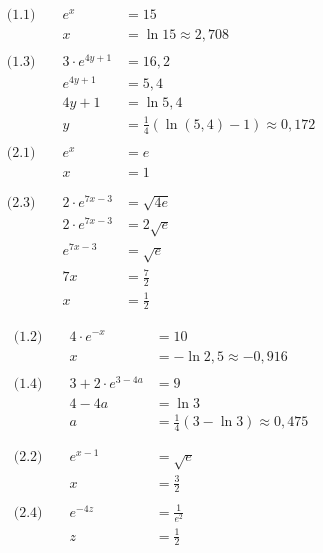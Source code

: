 \begin{minipage}[t]{0.5\textwidth}
    \begin{equation*}
        \begin{aligned}
            \text{(1.1) } && e^x &= 15 \\
            && x &= \ln{15} \approx 2,708 \\
            \ \\
            \text{(1.3) } && 3 \cdot e^{4y + 1} &= 16,2 \\
            && e^{4y + 1} &= 5,4 \\
            && 4y +1 &= \ln{5,4} \\
            && y &= \frac{1}{4}(\ln{(5,4)}-1) \approx 0,172 \\
            \ \\
            \text{(2.1) } && e^x &= e \\
            && x &= 1 \\
            \ \\
            \ \\
            \text{(2.3) } && 2 \cdot e^{7x -3} &= \sqrt{4e} \\
            && 2 \cdot e^{7x -3} &= 2\sqrt{e} \\
            && e^{7x -3} &= \sqrt{e} \\
            && 7x &= \frac{7}{2} \\
            && x &= \frac{1}{2}
        \end{aligned}
    \end{equation*}
\end{minipage}
\begin{minipage}[t]{0.5\textwidth}
    \begin{equation*}
        \begin{aligned}
            \text{(1.2) } && 4\cdot e^{-x} &= 10 \\
            && x &= - \ln{2,5} \approx -0,916 \\
            \ \\
            \text{(1.4) } && 3 + 2\cdot e^{3-4a} &= 9 \\
            && 4- 4a &= \ln{3} \\
            && a &= \frac{1}{4}(3 - \ln{3}) \approx0,475 \\
            \ \\
            \ \\
            \text{(2.2) } && e^{x -1} &= \sqrt{e} \\
            && x &= \frac{3}{2} \\
            \ \\
            \text{(2.4) } && e^{-4z} &= \frac{1}{e^2} \\
            && z &= \frac{1}{2}
        \end{aligned}
    \end{equation*}
\end{minipage}

